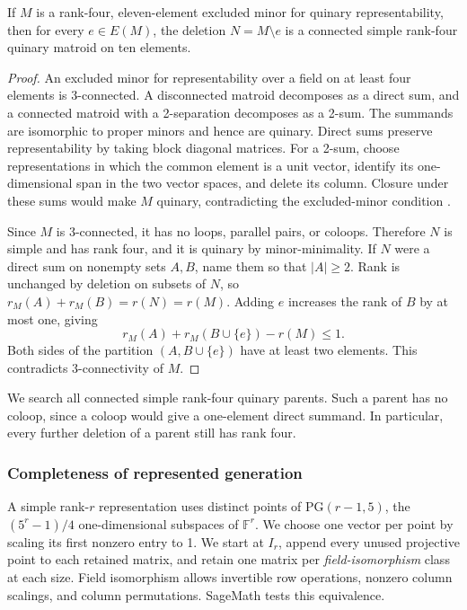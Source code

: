 \documentclass[11pt,letterpaper,titlepage]{article}
\def\F{\mathbb{F}}
\begin{document}
\begin{lemma}
\label{lem:method-parents}
If \(M\) is a rank-four, eleven-element excluded minor for quinary representability, then for every \(e\in E(M)\), the deletion \(N=M\setminus e\) is a connected simple rank-four quinary matroid on ten elements.
\end{lemma}
\begin{proof}
An excluded minor for representability over a field on at least four elements is 3-connected. A disconnected matroid decomposes as a direct sum, and a connected matroid with a 2-separation decomposes as a 2-sum. The summands are isomorphic to proper minors and hence are quinary. Direct sums preserve representability by taking block diagonal matrices. For a 2-sum, choose representations in which the common element is a unit vector, identify its one-dimensional span in the two vector spaces, and delete its column. Closure under these sums would make \(M\) quinary, contradicting the excluded-minor condition \cite{oxley}.

Since \(M\) is 3-connected, it has no loops, parallel pairs, or coloops. Therefore \(N\) is simple and has rank four, and it is quinary by minor-minimality. If \(N\) were a direct sum on nonempty sets \(A,B\), name them so that \(|A|\geq 2\). Rank is unchanged by deletion on subsets of \(N\), so \(r_M(A)+r_M(B)=r(N)=r(M)\). Adding \(e\) increases the rank of \(B\) by at most one, giving
\[
 r_M(A)+r_M(B\cup\{e\})-r(M)\leq 1.
\]
Both sides of the partition \((A,B\cup\{e\})\) have at least two elements. This contradicts 3-connectivity of \(M\).
\end{proof}

We search all connected simple rank-four quinary parents. Such a parent has no coloop, since a coloop would give a one-element direct summand. In particular, every further deletion of a parent still has rank four.

\subsubsection{Completeness of represented generation}

A simple rank-\(r\) representation uses distinct points of \(\mathrm{PG}(r-1,5)\), the \((5^r-1)/4\) one-dimensional subspaces of \(\F^r\). We choose one vector per point by scaling its first nonzero entry to 1. We start at \(I_r\), append every unused projective point to each retained matrix, and retain one matrix per \emph{field-isomorphism} class at each size. Field isomorphism allows invertible row operations, nonzero column scalings, and column permutations. SageMath tests this equivalence.
\end{document}
